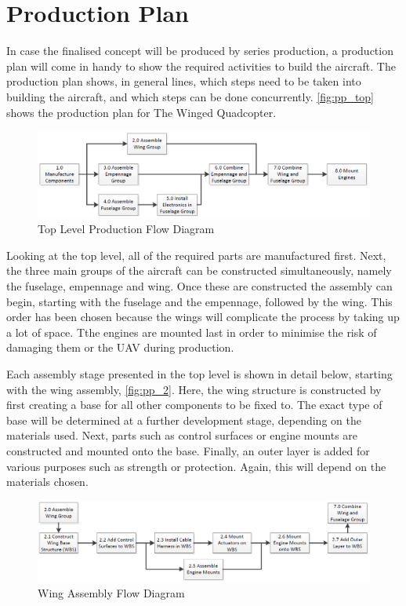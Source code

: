 \chapter{Production Plan}
\label{ch:prod_plan}

In case the finalised concept will be produced by series production, a production plan will come in handy to show the required activities to build the aircraft. The production plan shows, in general lines, which steps need to be taken into building the aircraft, and which steps can be done concurrently. \autoref{fig:pp_top} shows the production plan for The Winged Quadcopter.

\begin{figure}[H]
    \centering
    \includegraphics[width=\textwidth]{ProductionPlan/Figures/pp_top}
    \caption{Top Level Production Flow Diagram}
    \label{fig:pp_top}
\end{figure}

Looking at the top level, all of the required parts are manufactured first. Next, the three main groups of the aircraft can be constructed simultaneously, namely the fuselage, empennage and wing. Once these are constructed the assembly can begin, starting with the fuselage and the empennage, followed by the wing. This order has been chosen because the wings will complicate the process by taking up a lot of space. Tthe engines are mounted last in order to minimise the risk of damaging them or the UAV during production.

Each assembly stage presented in the top level is shown in detail below, starting with the wing assembly, \autoref{fig:pp_2}. Here, the wing structure is constructed by first creating a base for all other components to be fixed to. The exact type of base will be determined at a further development stage, depending on the materials used. Next, parts such as control surfaces or engine mounts are constructed and mounted onto the base. Finally, an outer layer is added for various purposes such as strength or protection. Again, this will depend on the materials chosen.

\begin{figure}[H]
    \centering
    \includegraphics[width=\textwidth]{ProductionPlan/Figures/pp_2}
    \caption{Wing Assembly Flow Diagram}
    \label{fig:pp_2}
\end{figure}

